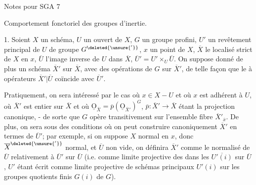 {}
\begin{flushright}Notes pour SGA 7\end{flushright}
Comportement fonctoriel des groupes d'inertie.

1. Soient $X$ un schéma, $U$ un ouvert de $X$, $G$ un groupe profini, $U'$ un revêtement principal de $U$ de groupe $G^{\deleted{\unsure{'}}}$, $x$ un point  de $X$, $\overline X$ le localisé strict de $X$ en $x$, $\overline U$ l'image inverse de $U$ dans $\overline X$, $\overline U'=U'\times_U\overline U$. On suppose donné de plus un schéma $\overline X'$ sur $\overline X$, avec des opérations de $G$ sur $\overline X'$, de telle façon que le   à opérateurs $\overline X'|\overline U$ coïncide avec $\overline U'$.

Pratiquement, on sera intéressé par le cas où $x\in X-U$ et où $x$ est adhérent à $U$, où $\overline X'$ est entier sur $\overline X$ et où $\underline{\mathrm O}_{\overline X}=\overline p(\underline{\mathrm O}_{\overline X'})^G$, $\overline p:\overline X'\to\overline X$ étant la projection canonique, - de sorte que $G$ opère transitivement sur l'ensemble fibre $\overline X'_{\overline x}$. De plus, on  sera  sous des conditions où on peut construire canoniquement $\overline X'$ en termes de $\overline U'$; par exemple, si on suppose $X$ normal en $x$, donc $\overline X^{\deleted{\unsure{'}}}$ normal, et $\overline U$ non vide, on définira $\overline X'$ comme le normalisé de $\overline U$ relativement à $\overline U'$ sur $\overline U$ (i.e. comme limite projective des  dans les $\overline{U'(i)}$ sur $\overline U$, $U'$ étant écrit comme limite projective de schémas principaux $U'(i)$ sur les groupes quotients finis $G(i)$ de $G$).

